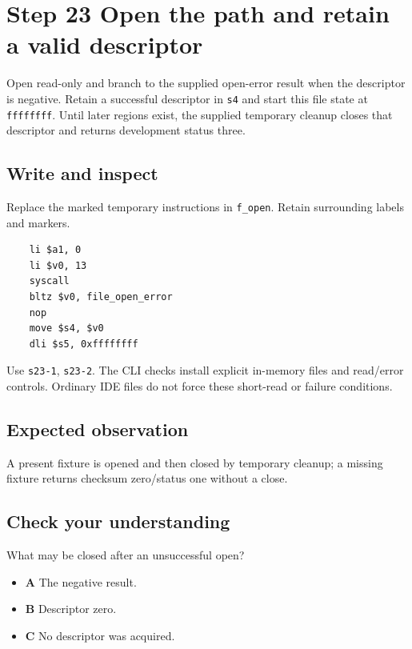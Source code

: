 \section{Step 23 Open the path and retain a valid descriptor}\label{crc-s23}

Open read-only and branch to the supplied open-error result when the descriptor is negative. Retain a successful descriptor in \texttt{s4} and start this file state at \texttt{ffffffff}. Until later regions exist, the supplied temporary cleanup closes that descriptor and returns development status three.

\subsection{Write and inspect}
Replace the marked temporary instructions in \texttt{f\_open}. Retain surrounding labels and markers.

\begin{verbatim}
    li $a1, 0
    li $v0, 13
    syscall
    bltz $v0, file_open_error
    nop
    move $s4, $v0
    dli $s5, 0xffffffff
\end{verbatim}

Use \texttt{s23-1}, \texttt{s23-2}. The CLI checks install explicit in-memory files and read/error controls. Ordinary IDE files do not force these short-read or failure conditions.

\subsection{Expected observation}
A present fixture is opened and then closed by temporary cleanup; a missing fixture returns checksum zero/status one without a close.

\subsection{Check your understanding}
What may be closed after an unsuccessful open?

\begin{itemize}
\item \textbf{A} The negative result.
\item \textbf{B} Descriptor zero.
\item \textbf{C} No descriptor was acquired.
\end{itemize}
